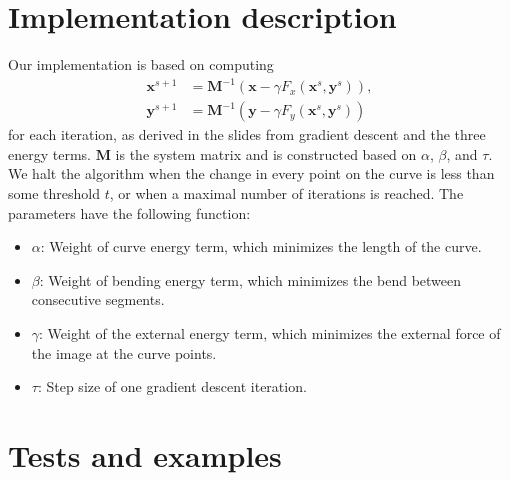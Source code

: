 \documentclass[11pt,a4paper]{article}
\begin{document}
\section{Implementation description}
%
Our implementation is based on computing
%
\begin{align}
\mathbf{x}^{s+1} &= \mathbf{M}^{-1} (\mathbf{x} - \gamma F_x(\mathbf{x}^s, \mathbf{y}^s)), \\
\mathbf{y}^{s+1} &= \mathbf{M}^{-1} (\mathbf{y} - \gamma F_y(\mathbf{x}^s, \mathbf{y}^s))
\end{align}
%
for each iteration, as derived in the slides from gradient descent and the three energy terms. $\mathbf{M}$ is the system matrix and is constructed based on $\alpha$, $\beta$, and $\tau$. We halt the algorithm when the change in every point on the curve is less than some threshold $t$, or when a maximal number of iterations is reached. The parameters have the following function:
%
\begin{itemize}
\item $\alpha$: Weight of curve energy term, which minimizes the length of the curve.
\item $\beta$: Weight of bending energy term, which minimizes the bend between consecutive segments.
\item $\gamma$: Weight of the external energy term, which minimizes the external force of the image at the curve points.
\item $\tau$: Step size of one gradient descent iteration.
\end{itemize}
%
\section{Tests and examples}
\end{document}
